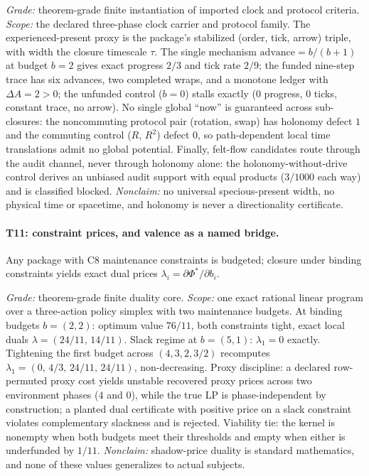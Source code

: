 \begin{theorem}
\gradeS{} \emph{Grade:} theorem-grade finite instantiation of imported clock
and protocol criteria. \emph{Scope:} the declared three-phase clock carrier
and protocol family. The experienced-present proxy is the package's
stabilized (order, tick, arrow) triple, with width the closure timescale
$\tau$. The single mechanism $\mathrm{advance} = b/(b+1)$ at budget $b=2$
gives exact progress $2/3$ and tick rate $2/9$; the funded nine-step trace
has six advances, two completed wraps, and a monotone ledger with
$\Delta A = 2 > 0$; the unfunded control ($b=0$) stalls exactly ($0$
progress, $0$ ticks, constant trace, no arrow). No single global ``now'' is
guaranteed across sub-closures: the noncommuting protocol pair (rotation,
swap) has holonomy defect $1$ and the commuting control ($R$, $R^2$) defect
$0$, so path-dependent local time translations admit no global potential.
Finally, felt-flow candidates route through the audit channel, never through
holonomy alone: the holonomy-without-drive control derives an unbiased audit
support with equal products ($3/1000$ each way) and is classified blocked.
\emph{Nonclaim:} no universal specious-present width, no physical time or
spacetime, and holonomy is never a directionality certificate.
\end{theorem}

\paragraph{T11: constraint prices, and valence as a named bridge.}
Any package with C8 maintenance constraints is budgeted; closure under
binding constraints yields exact dual prices $\lambda_i = \partial \Phi^* /
\partial b_i$.

\begin{theorem}
\gradeS{} \emph{Grade:} theorem-grade finite duality core. \emph{Scope:} one
exact rational linear program over a three-action policy simplex with two
maintenance budgets. At binding budgets $b=(2,2)$: optimum value $76/11$,
both constraints tight, exact local duals $\lambda = (24/11,\, 14/11)$. Slack
regime at $b=(5,1)$: $\lambda_1 = 0$ exactly. Tightening the first budget
across $(4,3,2,3/2)$ recomputes $\lambda_1 = (0,\, 4/3,\, 24/11,\, 24/11)$,
non-decreasing. Proxy discipline: a declared row-permuted proxy cost yields
unstable recovered proxy prices across two environment phases ($4$ and $0$),
while the true LP is phase-independent by construction; a planted dual
certificate with positive price on a slack constraint violates complementary
slackness and is rejected. Viability tie: the kernel is nonempty when both
budgets meet their thresholds and empty when either is underfunded by
$1/11$. \emph{Nonclaim:} shadow-price duality is standard mathematics, and
none of these values generalizes to actual subjects.
\end{theorem}

